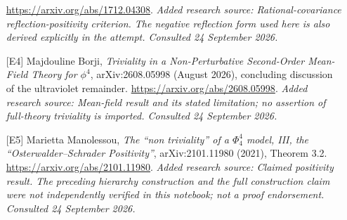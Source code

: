 \documentclass[11pt]{article}
\begin{document}
\begin{itemize}
\url{https://arxiv.org/abs/1712.04308}.
{\small\textit{Added research source: Rational-covariance reflection-positivity criterion. The negative reflection form used here is also derived explicitly in the attempt. Consulted 24 September 2026.}}
\item[\textnormal{[E4]}]\hypertarget{extra:30006697:4}{} Majdouline Borji, \emph{Triviality in a Non-Perturbative Second-Order Mean-Field Theory for $\phi^4$}, arXiv:2608.05998 (August 2026), concluding discussion of the ultraviolet remainder.
\url{https://arxiv.org/abs/2608.05998}.
{\small\textit{Added research source: Mean-field result and its stated limitation; no assertion of full-theory triviality is imported. Consulted 24 September 2026.}}
\item[\textnormal{[E5]}]\hypertarget{extra:30006697:5}{} Marietta Manolessou, \emph{The ``non triviality'' of a $\Phi^4_4$ model, III, the ``Osterwalder--Schrader Positivity''}, arXiv:2101.11980 (2021), Theorem 3.2.
\url{https://arxiv.org/abs/2101.11980}.
{\small\textit{Added research source: Claimed positivity result. The preceding hierarchy construction and the full construction claim were not independently verified in this notebook; not a proof endorsement. Consulted 24 September 2026.}}
\end{itemize}
\end{document}
